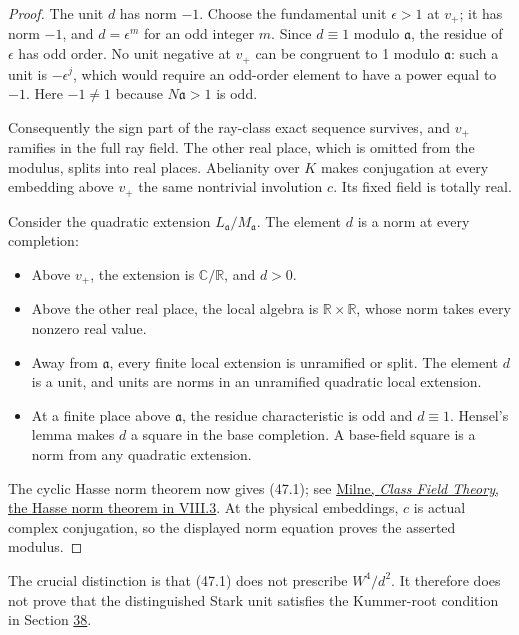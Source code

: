 \documentclass[11pt,reqno]{amsart}
\theoremstyle{plain}
\begin{document}
\begin{proof}
The unit \(d\) has norm \(-1\). Choose the fundamental
unit \(\epsilon>1\) at \(v_+\); it has norm \(-1\), and
\(d=\epsilon^m\) for an odd integer \(m\). Since \(d\equiv1\)
modulo \(\mathfrak a\), the residue of \(\epsilon\) has odd order.
No unit negative at \(v_+\) can be congruent to 1 modulo
\(\mathfrak a\): such a unit is \(-\epsilon^j\), which would
require an odd-order element to have a power equal to \(-1\).
Here \(-1\ne1\) because \(N\mathfrak a>1\) is odd.

Consequently the sign part of the ray-class exact sequence survives,
and \(v_+\) ramifies in the full ray field. The other real place,
which is omitted from the modulus, splits into real places. Abelianity
over \(K\) makes conjugation at every embedding above \(v_+\) the
same nontrivial involution \(c\). Its fixed field is totally real.

Consider the quadratic extension \(L_{\mathfrak a}/M_{\mathfrak a}\).
The element \(d\) is a norm at every completion:

\begin{itemize}
\item Above \(v_+\), the extension is \(\mathbb C/\mathbb R\), and
\(d>0\).
\item Above the other real place, the local algebra is
\(\mathbb R\times\mathbb R\), whose norm takes every nonzero
real value.
\item Away from \(\mathfrak a\), every finite local extension is
unramified or split. The element \(d\) is a unit, and units are
norms in an unramified quadratic local extension.
\item At a finite place above \(\mathfrak a\), the residue characteristic
is odd and \(d\equiv1\). Hensel's lemma makes \(d\) a square in
the base completion. A base-field square is a norm from any
quadratic extension.
\end{itemize}

The cyclic Hasse norm theorem now gives (47.1); see
\href{https://www.jmilne.org/math/CourseNotes/CFT.pdf}{Milne, \emph{Class Field Theory}, the Hasse norm theorem in VIII.3}.
At the physical embeddings, \(c\) is actual complex conjugation,
so the displayed norm equation proves the asserted modulus.
\end{proof}

The crucial distinction is that (47.1) does not prescribe
\(W^4/d^2\). It therefore does not prove that the distinguished
Stark unit satisfies the Kummer-root condition in Section \hyperref[sec:38]{38}.
\end{document}
